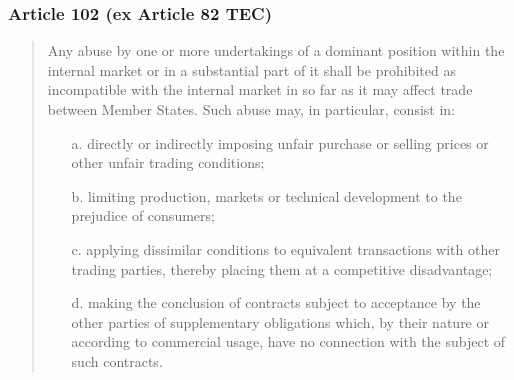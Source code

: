         \subsubsection{Article 102 (ex Article 82 TEC)}

            \begin{quote}
                Any abuse by one or more undertakings of a dominant position within the internal market or in a substantial part of it shall be prohibited as incompatible with the internal market in so far as it may affect trade between Member States.
                Such abuse may, in particular, consist in:
                    \begin{itemize}
                        \item[a.] directly or indirectly imposing unfair purchase or selling prices or other unfair trading conditions;
                        \item[b.] limiting production, markets or technical development to the prejudice of consumers;
                        \item[c.] applying dissimilar conditions to equivalent transactions with other trading parties, thereby placing them at a competitive disadvantage;
                        \item[d.] making the conclusion of contracts subject to acceptance by the other parties of supplementary obligations which, by their nature or according to commercial usage, have no connection with the subject of such contracts.
                    \end{itemize}
            \end{quote}


